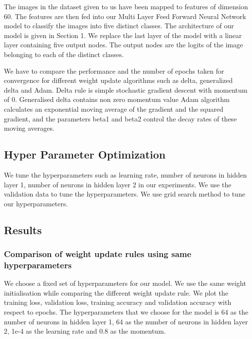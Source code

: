 \documentclass[10pt,a4paper]{article}
\begin{document}
The images in the dataset given to us have been mapped to features of dimension 60. 
The features are then fed into our Multi Layer Feed Forward Neural Network model to classify the images into five 
distinct classes. The architecture of our model is given in Section 1. We replace the last layer of the model with a 
linear layer containing five output nodes. The output nodes are the logits of the image belonging to each of the
distinct classes. 

We have to compare the performance and the number of epochs taken for convergence for different weight update algorithms such
as delta, generalized delta and Adam. Delta rule is simple stochastic gradient descent with momentum of 0. Generalised delta contains non zero momentum value
Adam algorithm calculates an exponential moving average of the gradient and the squared gradient, and the parameters beta1 and beta2 control the decay rates of these moving averages.

\subsection{Hyper Parameter Optimization}

We tune the hyperparameters such as learning rate, number of neurons in hidden layer 1, number of neurons in hidden layer 2 in our experiments.
We use the validation data to tune the hyperparameters. We use grid search method to tune our hyperparameters.

\subsection{Results}

\subsubsection{Comparison of weight update rules using same hyperparameters}

We choose a fixed set of hyperparameters for our model. We use the same weight initialisation 
while comparing the different weight update rule. We plot the training loss, validation loss, training accuracy and validation accuracy with respect to epochs.
The hyperparameters that we choose for the model is 64 as the number of neurons in hidden layer 1, 64 as the number of neurons in hidden layer 2, 1e-4 as the learning rate
and 0.8 as the momentum.
\end{document}
